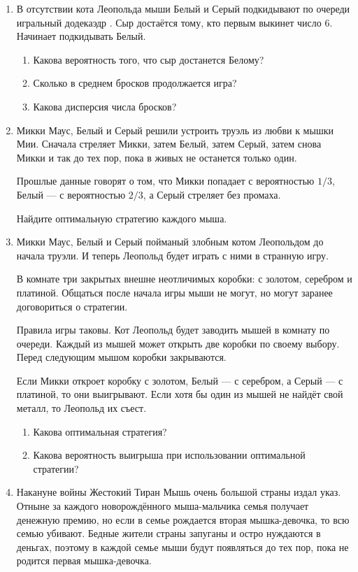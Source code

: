 \begin{enumerate}

\item В отсутствии кота Леопольда мыши Белый и Серый подкидывают по очереди игральный додекаэдр
.
Сыр достаётся тому, кто первым выкинет число 6. Начинает подкидывать Белый.

\begin{enumerate}
  \item Какова вероятность того, что сыр достанется Белому?
  \item Сколько в среднем бросков продолжается игра?
  \item Какова дисперсия числа бросков?
\end{enumerate}

\item Микки Маус, Белый и Серый решили устроить труэль из любви к мышки Мии. Сначала стреляет Микки, затем Белый, затем Серый, затем снова Микки и так до тех пор, пока в живых не останется только один.

Прошлые данные говорят о том, что Микки попадает с вероятностью $1/3$, Белый — с вероятностью $2/3$, а Серый стреляет без промаха.

Найдите оптимальную стратегию каждого мыша.

\item Микки Маус, Белый и Серый пойманый злобным котом Леопольдом до начала труэли. И теперь Леопольд будет играть с ними в странную игру.

В комнате три закрытых внешне неотличимых коробки: с золотом, серебром и платиной. Общаться после начала игры мыши не могут, но могут заранее договориться о стратегии.

Правила игры таковы. Кот Леопольд будет заводить мышей в комнату по очереди. Каждый из мышей может открыть
две коробки по своему выбору. Перед следующим мышом коробки закрываются.

Если Микки откроет коробку с золотом, Белый
— с серебром, а Серый — с платиной, то они выигрывают. Если
хотя бы один из мышей не найдёт свой металл, то Леопольд их съест.
\begin{enumerate}
\item Какова оптимальная стратегия?
\item Какова вероятность выигрыша при использовании оптимальной стратегии?
\end{enumerate}

\item Накануне войны Жестокий Тиран Мышь очень большой страны издал указ. Отныне за каждого новорождённого мыша-мальчика семья получает денежную премию, но если в семье рождается вторая мышка-девочка, то всю семью убивают. Бедные жители страны запуганы и остро нуждаются в деньгах, поэтому в каждой семье мыши будут появляться до тех пор, пока не родится первая мышка-девочка.


\end{enumerate}
